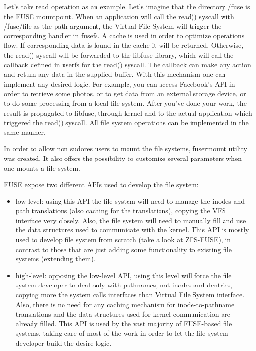         Let's take read operation as an example. Let's imagine that the directory /fuse is the FUSE mountpoint. When an application will call the read() syscall with /fuse/file as the path argument, the Virtual File System will trigger the corresponding handler in fusefs. A cache is used in order to optimize operations flow. If corresponding data is found in the cache it will be returned. Otherwise, the read() syscall will be forwarded to the libfuse library, which will call the callback defined in userfs for the read() syscall. The callback can make any action and return any data in the supplied buffer. With this mechanism one can implement any desired logic. For example, you can access Facebook's API in order to retrieve some photos, or to get data from an external storage device, or to do some processing from a local file system. After you've done your work, the result is propagated to libfuse, through kernel and to the actual application which triggered the read() syscall. All file system operations can be implemented in the same manner.
        
        In order to allow non sudores users to mount the file systems, fusermount utility was created. It also offers the possibility to customize several parameters when one mounts a file system.
        
        FUSE expose two different APIs used to develop the file system:
        \begin{itemize}
            \item low-level: using this API the file system will need to manage the inodes and path translations (also caching for the translations), copying the VFS interface very closely. Also, the file system will need to manually fill and use the data structures used to communicate with the kernel. This API is mostly used to develop file system from scratch (take a look at ZFS-FUSE), in contrast to those that are just adding some functionality to existing file systems (extending them). 
            \item high-level: opposing the low-level API, using this level will force the file system developer to deal only with pathnames, not inodes and dentries, copying more the system calls interfaces than Virtual File System interface. Also, there is no need for any caching mechanism for inode-to-pathname translations and the data structures used for kernel communication are already filled. This API is used by the vast majority of FUSE-based file systems, taking care of most of the work in order to let the file system developer build the desire logic.
        \end{itemize}
        
